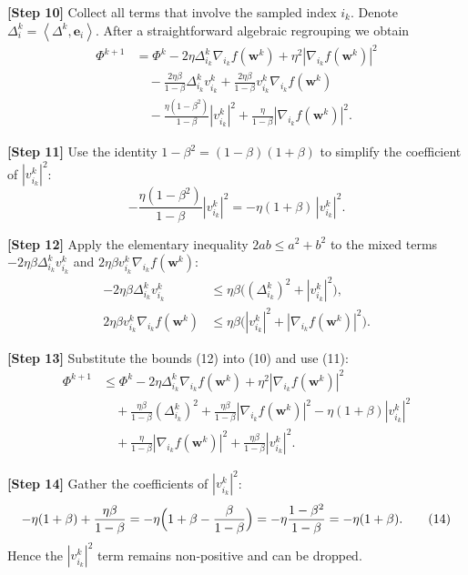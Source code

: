 \documentclass{article}
\newcommand{\ip}[2]{\left\langle #1,#2\right\rangle}
\begin{document}
\medskip
\noindent\textbf{[Step 10]} Collect all terms that involve the sampled index $i_k$.
Denote $\Delta^{k}_{i}= \ip{\Delta^{k}}{\mathbf e_i}$.
After a straightforward algebraic regrouping we obtain
\[
\begin{aligned}
\Phi^{k+1}
&= \Phi^{k}
   -2\eta\Delta^{k}_{i_k}\nabla_{i_k} f(\mathbf w^{k})
   +\eta^{2}|\nabla_{i_k} f(\mathbf w^{k})|^{2} \\
&\quad -\frac{2\eta\beta}{1-\beta}\Delta^{k}_{i_k}v^{k}_{i_k}
   +\frac{2\eta\beta}{1-\beta}v^{k}_{i_k}\nabla_{i_k} f(\mathbf w^{k}) \\
&\quad -\frac{\eta(1-\beta^{2})}{1-\beta}|v^{k}_{i_k}|^{2}
   +\frac{\eta}{1-\beta}|\nabla_{i_k} f(\mathbf w^{k})|^{2}.
\end{aligned}
\tag{10}
\]

\medskip
\noindent\textbf{[Step 11]} Use the identity $1-\beta^{2}=(1-\beta)(1+\beta)$ to simplify the coefficient of $|v^{k}_{i_k}|^{2}$:
\[
-\frac{\eta(1-\beta^{2})}{1-\beta}|v^{k}_{i_k}|^{2}
= -\eta(1+\beta)\,|v^{k}_{i_k}|^{2}.
\tag{11}
\]

\medskip
\noindent\textbf{[Step 12]} Apply the elementary inequality $2ab\le a^{2}+b^{2}$ to the mixed terms
$-2\eta\beta\Delta^{k}_{i_k}v^{k}_{i_k}$ and $2\eta\beta v^{k}_{i_k}\nabla_{i_k} f(\mathbf w^{k})$:
\[
\begin{aligned}
-2\eta\beta\Delta^{k}_{i_k}v^{k}_{i_k}
&\le \eta\beta\bigl((\Delta^{k}_{i_k})^{2}+|v^{k}_{i_k}|^{2}\bigr),\\
2\eta\beta v^{k}_{i_k}\nabla_{i_k} f(\mathbf w^{k})
&\le \eta\beta\bigl(|v^{k}_{i_k}|^{2}+|\nabla_{i_k} f(\mathbf w^{k})|^{2}\bigr).
\end{aligned}
\tag{12}
\]

\medskip
\noindent\textbf{[Step 13]} Substitute the bounds (12) into (10) and use (11):
\[
\begin{aligned}
\Phi^{k+1}
&\le \Phi^{k}
   -2\eta\Delta^{k}_{i_k}\nabla_{i_k} f(\mathbf w^{k})
   +\eta^{2}|\nabla_{i_k} f(\mathbf w^{k})|^{2} \\
&\quad +\frac{\eta\beta}{1-\beta}(\Delta^{k}_{i_k})^{2}
   +\frac{\eta\beta}{1-\beta}|\nabla_{i_k} f(\mathbf w^{k})|^{2}
   -\eta(1+\beta)|v^{k}_{i_k}|^{2} \\
&\quad +\frac{\eta}{1-\beta}|\nabla_{i_k} f(\mathbf w^{k})|^{2}
   +\frac{\eta\beta}{1-\beta}|v^{k}_{i_k}|^{2}.
\end{aligned}
\tag{13}
\]

\medskip
\noindent\textbf{[Step 14]} Gather the coefficients of $|v^{k}_{i_k}|^{2}$:
\[
-\eta(1+\beta)+\frac{\eta\beta}{1-\beta}
= -\eta\Bigl(1+\beta-\frac{\beta}{1-\beta}\Bigr)
= -\eta\frac{1-\beta^{2}}{1-\beta}
= -\eta(1+\beta).
\tag{14}
\]
Hence the $|v^{k}_{i_k}|^{2}$ term remains non‑positive and can be dropped.
\end{document}
